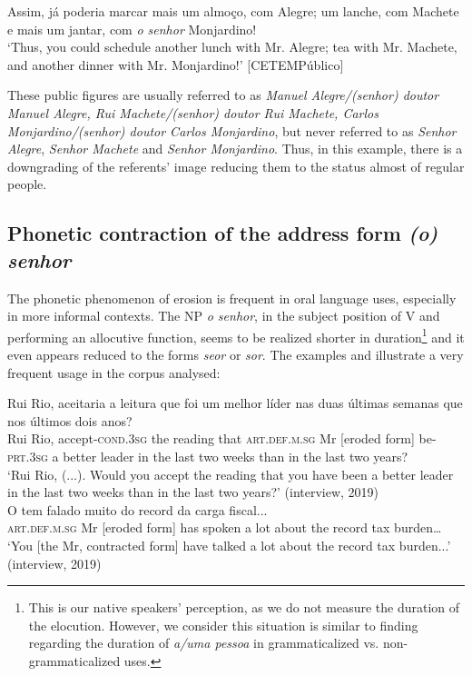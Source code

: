 \documentclass[output=paper]{langscibook}
\begin{document}
\ea\label{ex:marques:29}
Assim, já poderia marcar mais um almoço, com  Alegre; um lanche, com  Machete e mais um jantar, com \textit{o senhor} Monjardino!\\
\glt ‘Thus, you could schedule another lunch with Mr. Alegre; tea with Mr. Machete, and another dinner with Mr. Monjardino!’ [CETEMPúblico]\\
\z 

\begin{sloppypar}
These public figures are usually referred to as \textit{Manuel Alegre\slash (senhor) doutor Manuel Alegre, Rui Machete\slash (senhor) doutor Rui Machete, Carlos Monjardino\slash (senhor) doutor Carlos Monjardino}, but never referred to as \textit{Senhor Alegre}, \textit{Senhor Machete} and \textit{Senhor Monjardino}. Thus, in this example, there is a downgrading of the referents’ image reducing them to the status almost of regular people. 
\end{sloppypar}


\subsection{Phonetic contraction of the address form \textit{(o) senhor}}\label{sec:marques:4.4}

The phonetic phenomenon of erosion is frequent in oral language uses, especially in more informal contexts. The NP \textit{o senhor}, in the subject position of V and performing an allocutive function, seems to be realized shorter in duration\footnote{This is our native speakers' perception, as we do not measure the duration of the elocution. However, we consider this situation is similar to  finding regarding the duration of \textit{a/uma pessoa} in grammaticalized vs. non-grammaticalized uses.}  and it even appears reduced to the forms \textit{seor} or \textit{sor}. The examples  and  illustrate a very frequent usage in the corpus analysed:

\ea\label{ex:marques:30}
\gll Rui Rio,   aceitaria      a leitura que                                 foi       um melhor líder nas {duas últimas semanas que nos últimos dois anos?} \\
         Rui Rio, accept-\textsc{cond.3sg} the reading that  \textsc{art.def.m.sg}  {Mr [eroded form]} be-\textsc{prt.3sg}   a better leader {in the} {last two weeks than in the last two years?}\\
\glt ‘Rui Rio, (...). Would you accept the reading that you have been a better leader in the last two weeks than in the last two years?’ (interview, 2019)\\
\ex\label{ex:marques:31}
\gll O                        {tem falado}      {muito do record da carg}a fiscal...\\
         \textsc{art.def.m.sg}  {Mr [eroded form]}  {has spoken}  {a lot about the record tax} burden…\\
\glt ‘You [the Mr, contracted form] have talked a lot about the record tax burden...’  (interview, 2019)
\z 
\end{document}
